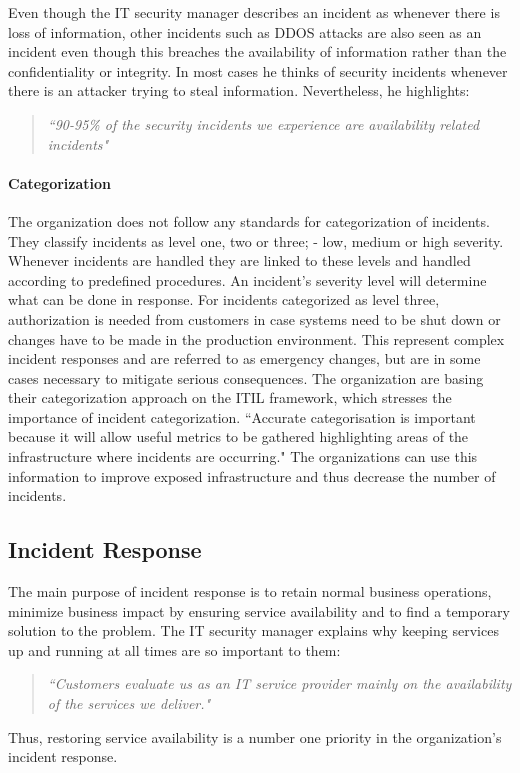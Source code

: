 Even though the IT security manager describes an incident as whenever there is loss of information, other incidents such as DDOS attacks are also seen as an incident even though this breaches the availability of information rather than the confidentiality or integrity. In most cases he thinks of security incidents whenever there is an attacker trying to steal information. Nevertheless, he highlights:
\begin{quote}
\textit{``90-95\% of the security incidents we experience are availability related incidents"}
\end{quote}

\paragraph{Categorization}
The organization does not follow any standards for categorization of incidents. They classify incidents as level one, two or three; - low, medium or high severity. Whenever incidents are handled they are linked to these levels and handled according to predefined procedures. An incident's severity level will determine what can be done in response. For incidents categorized as level three, authorization is needed from customers in case systems need to be shut down or changes have to be made in the production environment. This represent complex incident responses and are referred to as emergency changes, but are in some cases necessary to mitigate serious consequences. 
The organization are basing their categorization approach on the ITIL framework, which stresses the importance of incident categorization. ``Accurate categorisation is important because it will allow useful metrics to be gathered highlighting areas of the infrastructure where incidents are occurring\cite{itilbok}." The organizations can use this information to improve exposed infrastructure and thus decrease the number of incidents.

\subsection{Incident Response}
The main purpose of incident response is to retain normal business operations, minimize business impact by ensuring service availability and to find a temporary solution to the problem. The IT security manager explains why keeping services up and running at all times are so important to them:
\begin{quote}
\textit{``Customers evaluate us as an IT service provider mainly on the availability of the services we deliver."}
\end{quote}
Thus, restoring service availability is a number one priority in the organization's incident response.

